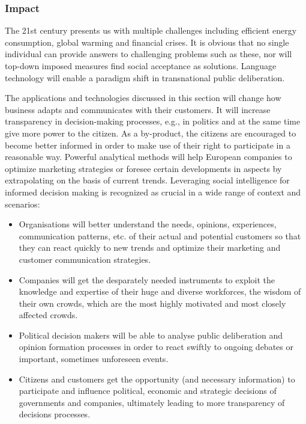 \documentclass[10pt, plain]{../../metanetpaper}
\begin{document}
\begin{multicols}{2}
\subsubsection{Impact}
\label{sec:impact-pt2}

The 21st century presents us with multiple challenges including efficient energy consumption, global warming and financial crises. It is obvious that no single individual can provide answers to challenging problems such as these, nor will top-down imposed measures find social acceptance as solutions. Language technology will enable a paradigm shift in transnational public deliberation.
 
The applications and technologies discussed in this section will change how business adapts and communicates with their customers. It will increase transparency in decision-making processes, e.g., in politics and at the same time give more power to the citizen. As a by-product, the citizens are encouraged to become better informed in order to make use of their right to participate in a reasonable way.
Powerful analytical methods will help European companies to optimize marketing strategies or foresee certain developments in aspects by extrapolating on the basis of current trends. Leveraging social intelligence for informed decision making is recognized as crucial in a wide range of context and scenarios:

\begin{itemize}
\item Organisations will better understand the needs, opinions, experiences, communication patterns, etc. of their actual and potential customers so that they can react quickly to new trends and optimize their marketing and customer communication strategies.
\item Companies will get the desparately needed instruments to exploit the knowledge and expertise of their huge and diverse workforces, the wisdom of their own crowds, which are the most highly motivated and most closely affected crowds.
\item Political decision makers will be able to analyse public deliberation and opinion formation processes in order to react swiftly to ongoing debates or important, sometimes unforeseen events.
\item Citizens and customers get the opportunity (and necessary information) to participate and influence political, economic and strategic decisions of governments and companies, ultimately leading to more transparency of decisions processes.
\end{itemize}


\end{multicols}
\end{document}
